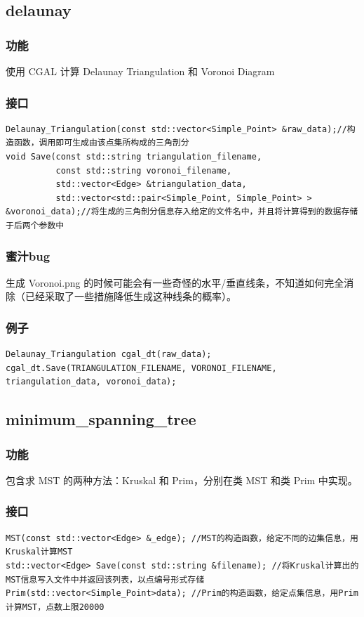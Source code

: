 \documentclass[a4paper]{article}
\begin{document}
\subsection{delaunay}
\subsubsection{功能}
使用 CGAL 计算 Delaunay Triangulation 和 Voronoi Diagram
\subsubsection{接口}
\begin{lstlisting}
Delaunay_Triangulation(const std::vector<Simple_Point> &raw_data);//构造函数，调用即可生成由该点集所构成的三角剖分
void Save(const std::string triangulation_filename,
          const std::string voronoi_filename,
          std::vector<Edge> &triangulation_data,
          std::vector<std::pair<Simple_Point, Simple_Point> > &voronoi_data);//将生成的三角剖分信息存入给定的文件名中，并且将计算得到的数据存储于后两个参数中
\end{lstlisting}
\subsubsection{蜜汁bug}
生成 Voronoi.png 的时候可能会有一些奇怪的水平/垂直线条，不知道如何完全消除（已经采取了一些措施降低生成这种线条的概率）。
\subsubsection{例子}
\begin{lstlisting}
Delaunay_Triangulation cgal_dt(raw_data);
cgal_dt.Save(TRIANGULATION_FILENAME, VORONOI_FILENAME, triangulation_data, voronoi_data);
\end{lstlisting}
\subsection{minimum\_spanning\_tree}
\subsubsection{功能}
包含求 MST 的两种方法：Kruskal 和 Prim，分别在类 MST 和类 Prim 中实现。
\subsubsection{接口}
\begin{lstlisting}
MST(const std::vector<Edge> &_edge); //MST的构造函数，给定不同的边集信息，用Kruskal计算MST
std::vector<Edge> Save(const std::string &filename); //将Kruskal计算出的MST信息写入文件中并返回该列表，以点编号形式存储
Prim(std::vector<Simple_Point>data); //Prim的构造函数，给定点集信息，用Prim计算MST，点数上限20000
\end{lstlisting}
\end{document}
